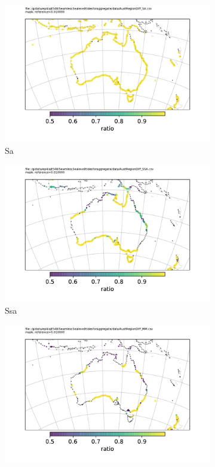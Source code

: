 \begin{figure}[h]\centering
    \begin{subfigure}[b]{\figwidthHalf}
        \includegraphics[width=\textwidth]{figures/maps/AustRegionDiff_SA.pdf}
        \caption{Sa}
    \end{subfigure}
    \begin{subfigure}[b]{\figwidthHalf}
        \includegraphics[width=\textwidth]{figures/maps/AustRegionDiff_SSA.pdf}
        \caption{Ssa}
    \end{subfigure}
    \begin{subfigure}[b]{\figwidthHalf}
        \includegraphics[width=\textwidth]{figures/maps/AustRegionDiff_MM.pdf}

\end{subfigure}
\end{figure}
